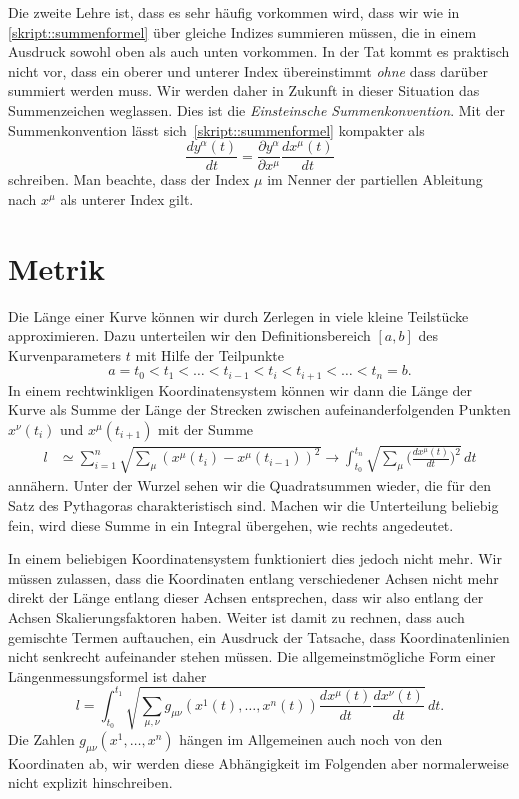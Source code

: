 Die zweite Lehre ist, dass es sehr häufig vorkommen wird, dass wir
wie in 
\eqref{skript::summenformel}
über gleiche Indizes summieren müssen, die in einem Ausdruck sowohl
oben als auch unten vorkommen.
In der Tat kommt es praktisch nicht vor, dass ein oberer und unterer
Index übereinstimmt {\em ohne} dass darüber summiert werden muss.
Wir werden daher in Zukunft in dieser Situation das Summenzeichen weglassen.
Dies ist die {\em Einsteinsche Summenkonvention}.
%
Mit der Summenkonvention lässt sich~\eqref{skript::summenformel} kompakter
als
\begin{equation}
\frac{dy^\alpha(t)}{dt}
=
\frac{\partial y^\alpha}{\partial x^\mu}\frac{dx^\mu(t)}{dt}
\end{equation}
schreiben.
Man beachte, dass der Index $\mu$ im Nenner der partiellen Ableitung nach
$x^\mu$ als unterer Index gilt.

%
%
\section{Metrik%
\label{skript:laengenmessung:section:metrik}}
Die Länge einer Kurve können wir durch Zerlegen in viele kleine Teilstücke
approximieren.
Dazu unterteilen wir den Definitionsbereich $[a,b]$ des Kurvenparameters $t$
mit Hilfe der Teilpunkte
\[
a = t_0 < t_1 < \dots < t_{i-1} < t_i < t_{i+1} < \dots < t_n = b.
\]
In einem rechtwinkligen Koordinatensystem können wir dann die Länge
der Kurve als Summe der Länge der Strecken zwischen aufeinanderfolgenden
Punkten $x^\nu(t_i)$ und $x^\mu(t_{i+1})$ mit der Summe
\begin{align*}
l
&\simeq
\sum_{i=1}^n \sqrt{\sum_{\mu} (x^{\mu}(t_i)-x^{\mu}(t_{i-1}))^2}
\rightarrow
\int_{t_0}^{t_n} \sqrt{\sum_{\mu}\biggl(\frac{dx^{\mu}(t)}{dt}\biggr)^2}\,dt
\end{align*}
annähern.
Unter der Wurzel sehen wir die Quadratsummen wieder, die für den
Satz des Pythagoras charakteristisch sind.
Machen wir die Unterteilung beliebig fein, wird diese Summe in ein
Integral übergehen, wie rechts angedeutet.

In einem beliebigen Koordinatensystem funktioniert dies jedoch nicht mehr.
Wir müssen zulassen, dass die Koordinaten entlang verschiedener
Achsen nicht mehr direkt der Länge entlang dieser Achsen entsprechen,
dass wir also entlang der Achsen Skalierungsfaktoren haben.
Weiter ist damit zu rechnen, dass auch gemischte Termen auftauchen, ein
Ausdruck der Tatsache, dass Koordinatenlinien nicht senkrecht aufeinander
stehen müssen.
Die allgemeinstmögliche Form einer Längenmessungsformel ist daher
\begin{equation}
l
=
\int_{t_0}^{t_1}
\sqrt{\sum_{\mu,\nu} g_{\mu\nu}(x^1(t),\dots,x^n(t)) \frac{dx^{\mu}(t)}{dt}\frac{dx^{\nu}(t)}{dt}}\,dt.
\label{skript:kruemmung:metrikformel}
\end{equation}
Die Zahlen $g_{\mu\nu}(x^1,\dots,x^n)$ hängen im Allgemeinen auch noch von
den Koordinaten ab, wir werden diese Abhängigkeit im Folgenden aber
normalerweise nicht explizit hinschreiben.

